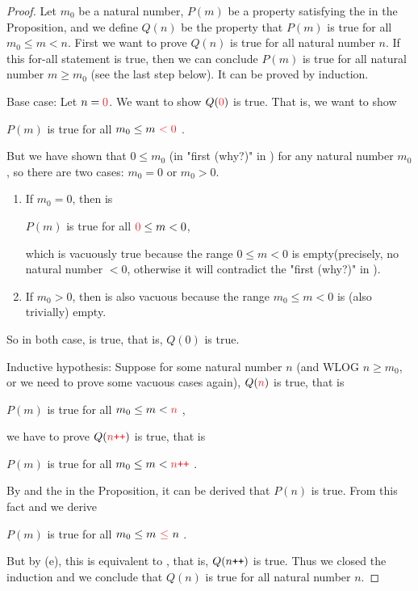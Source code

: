\begin{proof}
Let \(m_0\) be a natural number, \(P(m)\) be a property satisfying the  in the Proposition, and we define \(Q(n)\) be the property that \(P(m)\) is true for all \(m_0 \leq m < n\). First we want to prove \(Q(n)\) is true for all natural number \(n\). If this for-all statement is true, then we can conclude \(P(m)\) is true for all natural number \(m \geq m_0\) (see the last step below). It can be proved by induction.

Base case: Let \(n = \RED{0}\). We want to show \(Q(\RED{0})\) is true. That is, we want to show
\begin{center}
    \(P(m)\) is true for all \(m_0 \leq m\ \RED{< 0}\) .
\end{center}
But we have shown that \(0 \leq m_0\) (in "first (why?)" in ) for any natural number \(m_0\), so there are two cases: \(m_0 = 0\) or \(m_0 > 0\).
\begin{enumerate}
    \item If \(m_0 = 0\), then  is
        \begin{center}
            \(P(m)\) is true for all \(\RED{0} \leq m < 0\),
        \end{center}
        which is vacuously true because the range \(0 \leq m < 0\) is empty(precisely, no natural number \(< 0\), otherwise it will contradict the "first (why?)" in ).
    \item If \(m_0 > 0\), then  is also vacuous because the range \(m_0 \leq m < 0\) is (also trivially) empty.
\end{enumerate}
So in both case,  is true, that is, \(Q(0)\) is true.

Inductive hypothesis: Suppose for some natural number \(n\) (and WLOG \(n \geq m_0\), or we need to prove some vacuous cases again), \(Q(\RED{n})\) is true, that is
\begin{center}
    \(P(m)\) is true for all \(m_0 \leq m < \RED{n}\) ,
\end{center}
we have to prove \(Q(\RED{n\INC})\) is true, that is
\begin{center}
    \(P(m)\) is true for all \(m_0 \leq m < \RED{n\INC}\) .
\end{center}
By  and the  in the Proposition, it can be derived that \(P(n)\) is true. From this fact and  we derive
\begin{center}
    \(P(m)\) is true for all \(m_0 \leq m\ \RED{\leq}\ n\) .
\end{center}
But by (e), this is equivalent to , that is, \(Q(n\texttt{++})\) is true. Thus we closed the induction and we conclude that \(Q(n)\) is true for all natural number \(n\).


\end{proof}
